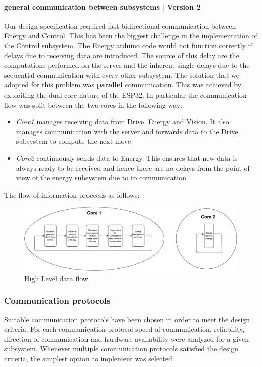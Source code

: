 \documentclass[10pt,twoside]{article}
\begin{document}
\paragraph{general communication between subsystems $\vert$ Version 2}
Our design specification required fast bidirectional communication between Energy and Control. This has been the biggest challenge in the implementation of the Control subsystem. The Energy arduino code would not function correctly if delays due to receiving data are introduced. The source of this delay are the computations performed on the server and the inherent single delays due to the sequential communication with every other subsystem. \newline
The solution that we adopted for this problem was \textbf{parallel} communication.
This was achieved by exploiting  the dual-core nature of the ESP32. In particular the communication flow was split between the two cores in the following way: 
\begin{itemize}
    \item \emph{Core1} manages receiving data from Drive, Energy and Vision. It also manages communication with the server and forwards data to the Drive subsystem to compute the next move
    \item \emph{Core2} continuously sends data to Energy. This ensures that new data is always ready to be received and hence there are no delays from the point of view of the energy subsystem due to to communication
\end{itemize}




The flow of information proceeds as follows:
\begin{figure}[hbt!]
    \centering
    \includegraphics[width = \textwidth]{esp32_flowchart.pdf}
    \captionsetup{justification=centering}
    \caption{High Level data flow}
\end{figure}


\subsubsection{Communication protocols} 
Suitable communication protocols have been chosen in order to meet the design criteria.
For each communication protocol speed of communication, reliability, direction of communication and hardware availability were analyzed for a given subsystem. Whenever multiple communication protocols satisfied the design criteria, the simplest option to implement was selected.
\end{document}
